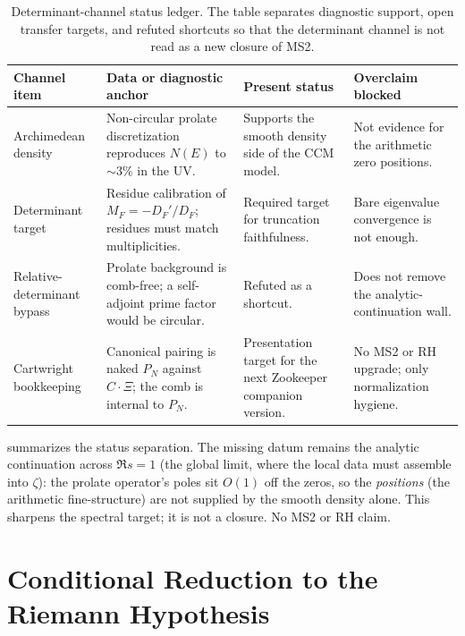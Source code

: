 \documentclass[12pt,a4paper]{article}
\theoremstyle{definition}
\theoremstyle{remark}
\begin{document}
\begin{table}[h]
\centering
\small
\setlength{\tabcolsep}{3pt}
\begin{tabular}{p{}p{}p{}p{}}
\toprule
Channel item & Data or diagnostic anchor & Present status & Overclaim blocked \\
\midrule
Archimedean density & Non-circular prolate discretization reproduces $N(E)$ to $\sim 3\%$ in the UV. &
Supports the smooth density side of the CCM model. & Not evidence for the arithmetic zero positions. \\
Determinant target & Residue calibration of $M_F=-D_F'/D_F$; residues must match multiplicities. &
Required target for truncation faithfulness. & Bare eigenvalue convergence is not enough. \\
Relative-determinant bypass & Prolate background is comb-free; a self-adjoint prime factor would be circular. &
Refuted as a shortcut. & Does not remove the analytic-continuation wall. \\
Cartwright bookkeeping & Canonical pairing is naked $P_N$ against $C\cdot\Xi$; the comb is internal to $P_N$. &
Presentation target for the next Zookeeper companion version. & No MS2 or RH upgrade; only normalization hygiene. \\
\bottomrule
\end{tabular}
\caption{Determinant-channel status ledger. The table separates diagnostic support, open transfer targets,
and refuted shortcuts so that the determinant channel is not read as a new closure of MS2.}
\label{tab:det-channel-ledger}
\end{table}

\noindent
{} summarizes the status separation. The missing
datum remains the analytic continuation across $\Re s=1$ (the global limit, where
the local data must assemble into $\zeta$): the prolate operator's poles sit
$O(1)$ off the zeros, so the \emph{positions} (the arithmetic fine-structure) are
not supplied by the smooth density alone. This sharpens the spectral target; it
is not a closure. No MS2 or RH claim.


\section{Conditional Reduction to the Riemann Hypothesis}
\label{sec:RH}
\end{document}
